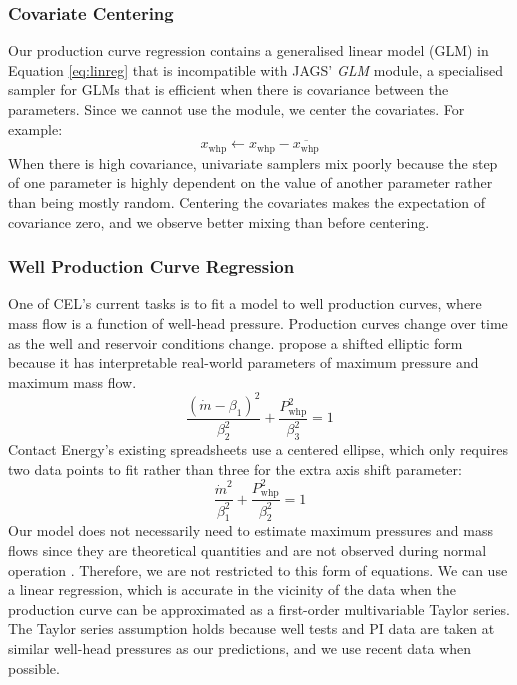 \documentclass[a4paper, 12pt]{article}
\begin{document}
\subsubsection{Covariate Centering}
Our production curve regression contains a generalised linear model (GLM) in Equation \ref{eq:linreg} that is incompatible with JAGS' \emph{GLM} module, a specialised sampler for GLMs that is efficient when there is covariance between the parameters. Since we cannot use the module, we center the covariates. For example:
\begin{equation}
x_\text{whp} \leftarrow x_\text{whp} - \overline{x_\text{whp}}
\end{equation}
When there is high covariance, univariate samplers mix poorly because the step of one parameter is highly dependent on the value of another parameter rather than being mostly random. Centering the covariates makes the expectation of covariance zero, and we observe better mixing than before centering.

\subsubsection{Well Production Curve Regression}
One of CEL's current tasks is to fit a model to well production curves, where mass flow is a function of well-head pressure. Production curves change over time as the well and reservoir conditions change. \citet*{Grant:2011} propose a shifted elliptic form because it has interpretable real-world parameters of maximum pressure and maximum mass flow.
\begin{equation}
\frac{\left( \dot{m}-\beta_1 \right)^2}{\beta_2^2} + \frac{P_\text{whp}^2}{\beta_3^2} = 1
\end{equation}
Contact Energy's existing spreadsheets use a centered ellipse, which only requires two data points to fit rather than three for the extra axis shift parameter:
\begin{equation}
\frac{\dot{m}^2}{\beta_1^2} + \frac{P_\text{whp}^2}{\beta_2^2} = 1
\end{equation}
Our model does not necessarily need to estimate maximum pressures and mass flows since they are theoretical quantities and are not observed during normal operation \citep{Marsh:2015}. Therefore, we are not restricted to this form of equations. We can use a linear regression, which is accurate in the vicinity of the data when the production curve can be approximated as a first-order multivariable Taylor series. The Taylor series assumption holds because well tests and PI data are taken at similar well-head pressures as our predictions, and we use recent data when possible.
\end{document}

